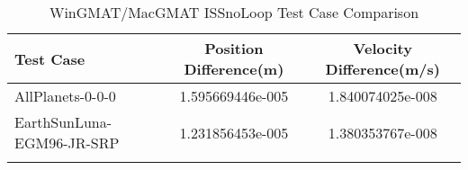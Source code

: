 \begin{table}[htbp!]
\centering
\caption{ WinGMAT/MacGMAT ISSnoLoop Test Case Comparison}
      \begin{tabular}{lcc}
      \hline\hline
          Test Case & Position Difference(m) & Velocity Difference(m/s) \\
         \hline
         AllPlanets-0-0-0 & 1.595669446e-005 & 1.840074025e-008 \\
         EarthSunLuna-EGM96-JR-SRP & 1.231856453e-005 & 1.380353767e-008 \\
      \hline\hline
      \label{Table: ISSnoLoop WinGMAT-MacGMAT Table} 
\end{tabular}
\end{table}
